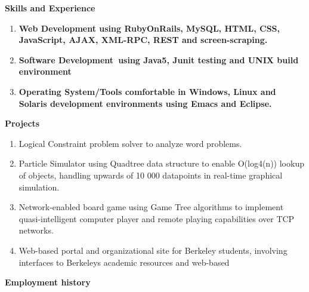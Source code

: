 \documentclass[12pt,twoside]{article}
\newcommand\liststyleWWviiiNumvi{%
\renewcommand\labelitemi{[F0A7?]}
\renewcommand\labelitemii{o}
\renewcommand\labelitemiii{[F0A7?]}
\renewcommand\labelitemiv{[F0B7?]}
}
\newcommand\liststyleLi{%
\renewcommand\labelitemi{[E00A?]}
\renewcommand\labelitemii{[25CB?]}
\renewcommand\labelitemiii{[25A0?]}
\renewcommand\labelitemiv{[25CF?]}
}
\begin{document}
\bigskip

{\sffamily\bfseries
Skills and Experience}


\bigskip

\liststyleWWviiiNumvi
\begin{enumerate}
\item {\sffamily\bfseries
Web Development \textmd{using RubyOnRails, MySQL, HTML, CSS, JavaScript,
AJAX, XML{}-RPC, REST and screen{}-scraping.}}
\item {\sffamily\bfseries
Software Development~\textmd{using Java5, Junit testing and UNIX build
environment}}
\item {\sffamily\bfseries
Operating System/Tools\textmd{ comfortable in Windows, Linux and Solaris
development environments using Emacs and Eclipse.}}
\end{enumerate}

\bigskip

{\sffamily\bfseries
Projects}

\liststyleLi
\begin{enumerate}
\item {\sffamily\mdseries
Logical Constraint problem solver to analyze word problems.}
\item {\sffamily\mdseries
Particle Simulator using Quadtree data structure to enable O(log4(n))
lookup of objects, handling upwards of 10 000 datapoints in real{}-time
graphical simulation.}
\item {\sffamily\mdseries
Network{}-enabled board game using Game Tree algorithms to implement
quasi{}-intelligent computer player and remote playing capabilities
over TCP networks.}
\item {\sffamily\mdseries
Web{}-based portal and organizational site for Berkeley students,
involving interfaces to Berkeley{\textquotesingle}s academic resources
and web{}-based }
\end{enumerate}

\bigskip

{\sffamily\bfseries
Employment history}


\bigskip
\end{document}
